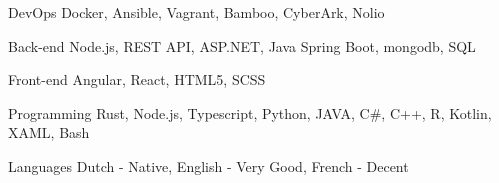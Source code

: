 

\begin{cvskills}

  \cvskill
    {DevOps} %
    {Docker, Ansible, Vagrant, Bamboo, CyberArk, Nolio} %

  \cvskill
    {Back-end} %
    {Node.js, REST API, ASP.NET, Java Spring Boot, mongodb, SQL} %

  \cvskill
    {Front-end} %
    {Angular, React, HTML5, SCSS} %

  \cvskill
    {Programming} %
    {Rust, Node.js, Typescript,  Python, JAVA, C\#, C++, R, Kotlin, XAML, Bash} %

  \cvskill
    {Languages} %
	{Dutch - Native, English - Very Good, French - Decent} %

\end{cvskills}
